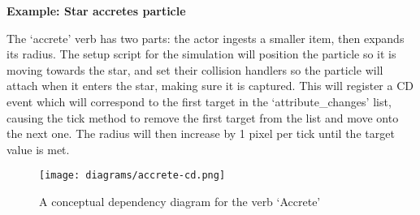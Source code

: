 \documentclass[dissertation.tex]{subfiles}
\begin{document}
    \textbf{Example: Star accretes particle}

    The `accrete' verb has two parts: the actor ingests a smaller item, then expands its radius. The setup script for the simulation will position the particle so it is moving towards the star, and set their collision handlers so the particle will attach when it enters the star, making sure it is captured. This will register a CD event which will correspond to the first target in the `attribute\_changes' list, causing the tick method to remove the first target from the list and move onto the next one. The radius will then increase by 1 pixel per tick until the target value is met.

    \begin{figure}[h]
        \begin{center}        
            \texttt{[image: diagrams/accrete-cd.png]}
        \end{center}
        \caption{A conceptual dependency diagram for the verb `Accrete'}
    \end{figure}




\end{document}
